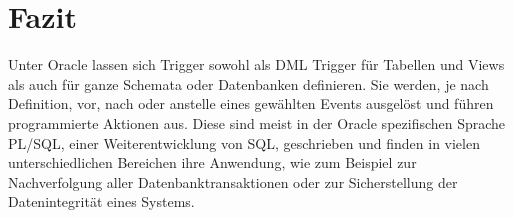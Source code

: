 \section{Fazit}
Unter Oracle lassen sich Trigger sowohl als DML Trigger für Tabellen und Views als auch für ganze Schemata oder Datenbanken definieren. Sie werden, je nach Definition, vor, nach oder anstelle eines gewählten Events ausgelöst und führen programmierte Aktionen aus. Diese sind meist in der Oracle spezifischen Sprache PL/SQL, einer Weiterentwicklung von SQL, geschrieben und finden in vielen unterschiedlichen Bereichen ihre Anwendung, wie zum Beispiel zur Nachverfolgung aller Datenbanktransaktionen oder zur Sicherstellung der Datenintegrität eines Systems.